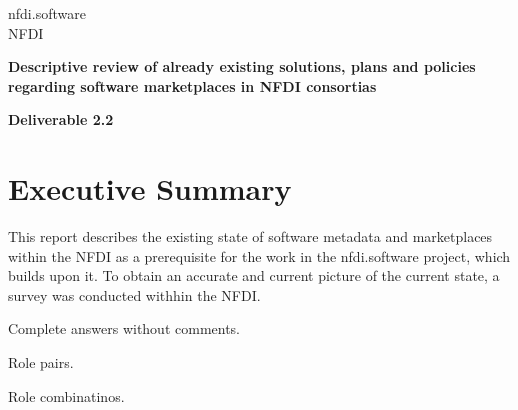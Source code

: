 \documentclass[headsepline,titlepage,twoside,12pt]{report}
\author{Konrad Höffner}
\begin{document}
\allowdisplaybreaks%

\begin{titlepage}
\thispagestyle{empty}
\begin{center}

{\large nfdi.software\\[1mm]}
NFDI\\

\vspace{2cm}

{\large\textbf{Descriptive review of already existing solutions, plans and policies regarding software marketplaces in NFDI consortias}}\\
\vspace*{4cm}


{\Huge\textbf{Deliverable 2.2}}\\

\end{center}
\end{titlepage}

\tableofcontents

\chapter{Executive Summary}
This report describes the existing state of software metadata and marketplaces within the NFDI as a prerequisite for the work in the nfdi.software project, which builds upon it.
To obtain an accurate and current picture of the current state, a survey was conducted withhin the NFDI.

\clearpage
\begin{sidewaystable}
\caption{Complete answers without comments.}
\label{tab:results}
\tiny
\setlength{\tabcolsep}{2pt}

\end{sidewaystable}
\restoregeometry

\begin{table}
\caption{Role pairs.}
\label{tab:role_pairs}

\end{table}

%

\begin{table}
\caption{Role combinatinos.}
\label{tab:role_combinations}

\end{table}
\end{document}
